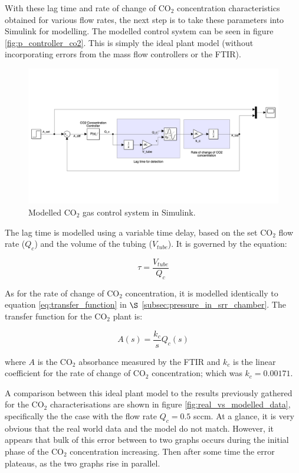 With these lag time and rate of change of CO$_2$ concentration characteristics obtained for various flow rates, the next step is to take these parameters into Simulink for modelling. The modelled control system can be seen in figure \ref{fig:p_controller_co2}. This is simply the ideal plant model (without incorporating errors from the mass flow controllers or the FTIR). 

\begin{figure}[h!]
	\centering
	\includegraphics[width=\linewidth]{chapter_5/figures/ideal_p_controller_co2.png}
	\caption{Modelled CO$_2$ gas control system in Simulink.}
	\label{fig:ideal_p_controller_co2}
\end{figure}

The lag time is modelled using a variable time delay, based on the set CO$_2$ flow rate ($Q_{c}$) and the volume of the tubing ($V_{tube}$). It is governed by the equation:

\begin{equation}
    \tau = \frac{V_{tube}}{Q_{c}}
\end{equation}

As for the rate of change of CO$_2$ concentration, it is modelled identically to equation \ref{eq:transfer_function} in $\S$ \ref{subsec:pressure_in_srr_chamber}. The transfer function for the CO$_2$ plant is:

\begin{equation}
    A(s) = \frac{k_c}{s} Q_{c}(s)
    \label{eq:transfer_function_co2}
\end{equation}

where $A$ is the CO$_2$ absorbance measured by the FTIR and $k_c$ is the linear coefficient for the rate of change of CO$_2$ concentration; which was $k_c = 0.00171$.

A comparison between this ideal plant model to the results previously gathered for the CO$_2$ characterisations are shown in figure \ref{fig:real_vs_modelled_data}, specifically the the case with the flow rate $Q_c = 0.5$ sccm. At a glance, it is very obvious that the real world data and the model do not match. However, it appears that bulk of this error between to two graphs occurs during the initial phase of the CO$_2$ concentration increasing. Then after some time the error plateaus, as the two graphs rise in parallel. 

